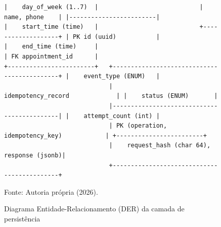 \documentclass[12pt,a4paper]{article}
\begin{document}
\begin{figure}[hbt]
\begin{lstlisting}
|    day_of_week (1..7)  |                            |    name, phone    | |------------------------|
|    start_time (time)   |                            +-------------------+ | PK id (uuid)           |
|    end_time (time)     |                                                  | FK appointment_id      |
+------------------------+   +--------------------------------------------+ |    event_type (ENUM)   |
                             |             idempotency_record             | |    status (ENUM)       |
                             |--------------------------------------------| |    attempt_count (int) |
                             | PK (operation, idempotency_key)            | +------------------------+
                             |    request_hash (char 64), response (jsonb)|
                             +--------------------------------------------+
\end{lstlisting}
\caption{Diagrama Entidade-Relacionamento (DER) da camada de persistência}
\label{fig:der_banco}
\vspace{0.1cm}
{\footnotesize Fonte: Autoria própria (2026).}
\end{figure}
\end{document}
